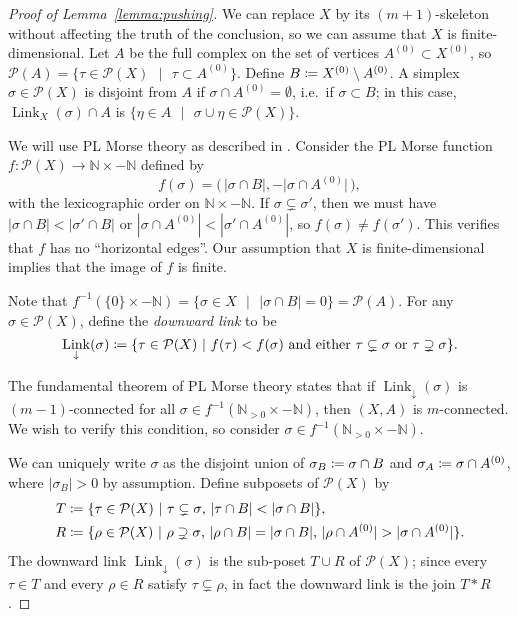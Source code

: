 \documentclass[11 pt]{article}
\theoremstyle{plain}
\theoremstyle{definition}
\numberwithin{equation}{section}
\newcommand\N{\ensuremath{\mathbb{N}}}
\newcommand\Set[2]{\ensuremath{\{\text{#1 $|$ #2}\}}}
\DeclareMathOperator{\Link}{Link}
\newcommand\Poset{\ensuremath{\mathcal{P}}}
\newcommand\coloneq{\mathrel{\mathop:}\mkern-1.2mu=}
\newcommand\abs[1]{\left\lvert#1\right\rvert}
\begin{document}
\begin{proof}[{Proof of Lemma~\ref{lemma:pushing}}]
We can replace $X$ by its $(m+1)$-skeleton without affecting the truth of the conclusion, 
so we can assume that $X$ is finite-dimensional.  Let $A$ be the full complex on the set of vertices $A^{(0)} \subset X^{(0)}$, so
$\Poset(A)=\Set{$\tau\in \Poset(X)$}{$\tau\subset A^{(0)}$}$.  Define $B\coloneq X^{(0)} \setminus A^{(0)}$.  
A simplex $\sigma\in \Poset(X)$ is 
disjoint from $A$ if $\sigma\cap A^{(0)}=\emptyset$, i.e.\ if $\sigma\subset B$; in 
this case, $\Link_X(\sigma)\cap A$ is $\Set{$\eta\in A$}{$\sigma\cup \eta\in \Poset(X)$}$.

We will use PL Morse theory as described in \cite{BestvinaPL}.
Consider the  PL Morse function $f\colon \Poset(X)\to \N\times -\N$ defined by 
\[f(\sigma)=\big(\,\lvert\sigma\cap B\rvert,-\lvert\sigma\cap A^{(0)}\rvert\,\big),\]%
with the lexicographic order on $\N\times -\N$.  If $\sigma\subsetneq \sigma'$, then
we must have $\abs{\sigma\cap B}<\abs{\sigma'\cap B}$ or 
$\abs{\sigma\cap A^{(0)}}<\abs{\sigma'\cap A^{(0)}}$, so $f(\sigma)\neq f(\sigma')$.  This verifies  
that $f$ has no ``horizontal edges''.  Our assumption that $X$ is finite-dimensional 
implies that the image of $f$ is finite.

Note that $f^{-1}(\{0\}\times -\N)=\Set{$\sigma\in X$}{$\abs{\sigma \cap B}=0$}=\Poset(A)$. 
For any $\sigma\in \Poset(X)$, define the \emph{downward link} to be
\[\Link_\downarrow(\sigma)\coloneq \Set{$\tau\in \Poset(X)$}{$f(\tau)<f(\sigma)$ and either $\tau\subsetneq \sigma$ or $\tau\supsetneq \sigma$}.\]
 
The fundamental theorem of PL Morse theory states that if $\Link_\downarrow(\sigma)$ 
is $(m-1)$-connected for all $\sigma\in f^{-1}(\N_{>0}\times -\N)$, then $(X,A)$ 
is $m$-connected.  We wish to verify this condition, so consider $\sigma \in f^{-1}(\N_{>0}\times -\N)$.

We can uniquely write $\sigma$ as the disjoint union of $\sigma_B\coloneq \sigma\cap B$ 
and $\sigma_A\coloneq \sigma\cap A^{(0)}$, where $\abs{\sigma_B}>0$ by assumption.    Define subposets of $\Poset(X)$ by
\begin{align*}
T&\coloneq \Set{$\tau\in \Poset(X)$}{$\tau\subsetneq \sigma$, $\abs{\tau\cap B}<\abs{\sigma\cap B}$},\\
R&\coloneq \Set{$\rho\in \Poset(X)$}{$\rho\supsetneq \sigma$, $\abs{\rho\cap B}=\abs{\sigma\cap B}$, $\lvert\rho\cap A^{(0)}\rvert>\lvert\sigma\cap A^{(0)}\rvert$}.
\end{align*} 
The downward link $\Link_\downarrow(\sigma)$ is the sub-poset $T\cup R$ of $\Poset(X)$; since 
every $\tau\in T$ and every $\rho\in R$ satisfy $\tau\subsetneq \rho$, in fact the downward link is 
the join $T\ast R$.  


\end{proof}
\end{document}
